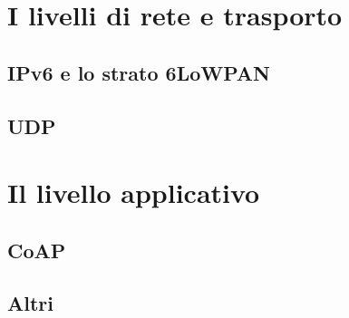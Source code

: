 \section{I livelli di rete e trasporto}

\subsection{IPv6 e lo strato 6LoWPAN}
\subsection{UDP}


\section{Il livello applicativo}

\subsection{CoAP}
\subsection{Altri}
